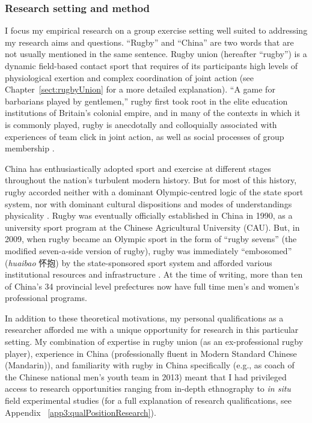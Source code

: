 \begin{CJK}{UTF8}{gbsn}
\subsubsection{Research setting and method}
I focus my empirical research on a group exercise setting well suited to addressing my research aims and questions.  ``Rugby'' and ``China'' are two words that are not usually mentioned in the same sentence.  Rugby union (hereafter ``rugby'') is a dynamic field-based contact sport that requires of its participants high levels of physiological exertion and complex coordination of joint action  (see Chapter~\ref{sect:rugbyUnion} for a more detailed explanation). ``A game for barbarians played by gentlemen,'' rugby first took root in the elite education institutions of Britain's colonial empire, and in many of the contexts in which it is commonly played, rugby is anecdotally and colloquially associated with experiences of team click in joint action, as well as social processes of group membership \citep{Dunning2005}.

China has enthusiastically adopted sport and exercise at different stages throughout the nation's turbulent modern history.  But for most of this history, rugby accorded neither with a dominant Olympic-centred logic of the state sport system, nor with dominant cultural dispositions and modes of understandings physicality \citep[which derived from hundreds of years of continuous history of Confucian and Daoist traditions of thought, see][]{Morris2004}.  Rugby was eventually officially established in China in 1990, as a university sport program at the Chinese Agricultural University (CAU).  But, in 2009, when rugby became an Olympic sport in the form of ``rugby sevens'' (the modified seven-a-side version of rugby), rugby was immediately ``embosomed'' (\textit{huaibao} 怀抱) by the state-sponsored sport system and afforded various institutional resources and infrastructure \citep{Xu2010}.  At the time of writing, more than ten of China's 34 provincial level prefectures now have full time men's and women's professional programs.

In addition to these theoretical motivations, my personal qualifications as a researcher afforded me with a unique opportunity for research in this particular setting.  My combination of expertise in rugby union (as an ex-professional rugby player), experience in China (professionally fluent in Modern Standard Chinese (Mandarin)), and familiarity with rugby in China specifically (e.g., as coach of the Chinese national men's youth team in 2013) meant that I had privileged access to research opportunities ranging from in-depth ethnography to \textit{in situ} field experimental studies (for a full explanation of research qualifications, see Appendix ~\ref{app3:qualPositionResearch}).


\end{CJK}
